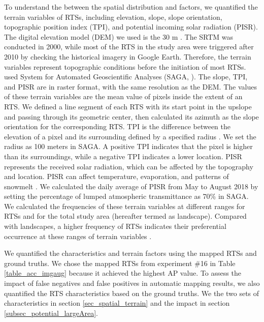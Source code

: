 \documentclass[authoryear,preprint,review,12pt]{elsarticle}
\begin{document}
To understand the  between the spatial distribution and  factors, we quantified the terrain variables of RTSs, including elevation, slope, slope orientation, topographic position index (TPI), and potential incoming solar radiation (PISR). The digital elevation model (DEM) we used is the 30 m  \citep{farr2007shuttle}. The SRTM  was conducted in 2000, while most of the RTS in the study area were triggered after 2010 by checking the historical imagery in Google Earth. Therefore, the terrain variables represent topographic conditions before the initiation of most RTSs.   used System for Automated Geoscientific Analyses (SAGA, \citealp{conrad2015system}).  The slope, TPI, and PISR are in raster format, with the same resolution as the DEM. The values of these terrain variables are the mean value of pixels inside the extent of an RTS. We defined a line segment of each RTS with its start point in the upslope and passing through its geometric center, then calculated its azimuth as the slope orientation for the corresponding RTS. TPI is the difference between the elevation of a pixel and its surrounding defined by a specified radius \citep{guisan1999glm, reu2013application}. We set the radius as 100 meters in SAGA. A positive TPI indicates that the pixel is higher than its surroundings, while a negative TPI indicates a lower location. PISR represents the received solar radiation, which can be affected by the topography and location. PISR can affect temperature, evaporation, and patterns of snowmelt \citep{bohner2009land}. We calculated the daily average of PISR from May to August 2018 by setting the percentage of lumped atmospheric transmittance as 70\% in SAGA. We calculated the frequencies of these terrain variables at different ranges for RTSs and for the total study area (hereafter termed as landscape). Compared with landscapes, a higher frequency of RTSs indicates their preferential occurrence at these ranges of terrain variables \citep{lacelle_distribution_2015}. 


We quantified the characteristics and terrain factors using the mapped RTSs and ground truths. We chose the mapped RTSs from experiment \#16 in Table \ref{table_acc_imgaug} because it achieved the highest AP value. To assess the impact of false negatives and false positives in automatic mapping results, we also quantified the RTS characteristics based on the ground truths. We  the two sets of characteristics in section \ref{sec_spatial_terrain} and  the impact in section \ref{subsec_potential_largeArea}. %
\end{document}

